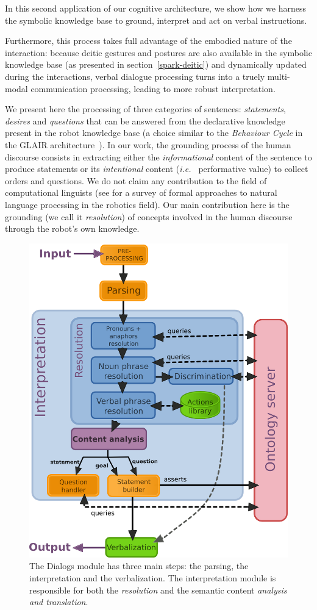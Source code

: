 \documentclass{svmult}
\newcommand{\ie}{{\textit{i.e.~}}}
\begin{document}
In this second application of our cognitive architecture, we show how we
harness the symbolic knowledge base to ground, interpret and act on verbal
instructions.

Furthermore, this process takes full advantage of the embodied nature of the
interaction: because deitic gestures and postures are also available in the
symbolic knowledge base (as presented in section~\ref{spark-deitic}) and
dynamically updated during the interactions, verbal dialogue processing turns
into a truely multi-modal communication processing, leading to more robust
interpretation.

We present here the processing of three categories of sentences:
\emph{statements}, \emph{desires} and \emph{questions} that can be answered
from the declarative knowledge present in the robot knowledge base (a choice
similar to the \emph{Behaviour Cycle} in the GLAIR
architecture~\cite{Shapiro2009}). In our work, the grounding process of the
human discourse consists in extracting either the \emph{informational} content
of the sentence to produce statements or its \emph{intentional} content (\ie
performative value) to collect orders and questions. We do not claim any
contribution to the field of computational linguists (see \cite{Kruijff2010}
for a survey of formal approaches to natural language processing in the
robotics field). Our main contribution here is the grounding (we call it
\emph{resolution}) of concepts involved in the human discourse through the
robot's own knowledge.

\begin{figure}[!t]
\centering
  \includegraphics[width=0.9\linewidth]{figs/dialog_module_simple.png}
  \caption{The {\sc Dialogs} module has three main steps: the parsing,
  the interpretation and the verbalization. The interpretation module is
  responsible for both the \emph{resolution} and the semantic content
  \emph{analysis and translation}.} 
  \label{fig|dialog}
\end{figure}
\end{document}
